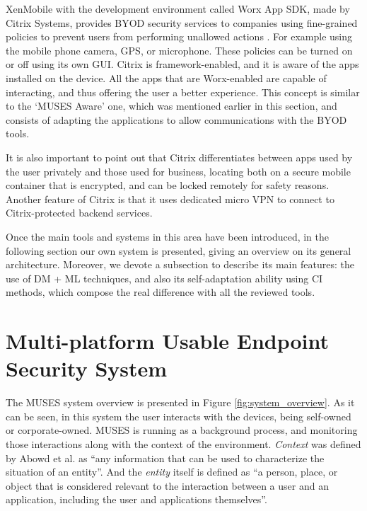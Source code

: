 XenMobile with the development environment called Worx App SDK, made by Citrix Systems, provides BYOD security services to companies using fine-grained policies to prevent users from performing unallowed actions \cite{WorxSDK}. For example using the mobile phone camera, GPS, or microphone. These policies can be turned on or off using its own GUI. Citrix is framework-enabled, and it is aware of the apps installed on the device. All the apps that are Worx-enabled are capable of interacting, and thus offering the user a better experience. This concept is similar to the `MUSES Aware' one, which was mentioned earlier in this section, and consists of adapting the applications to allow communications with the BYOD tools.

It is also important to point out that Citrix differentiates between apps used by the user privately and those used for business, locating both on a secure mobile container that is encrypted, and can be locked remotely for safety reasons. Another feature of Citrix is that it uses dedicated micro VPN to connect to Citrix-protected backend services.

Once the main tools and systems in this area have been introduced, in the following section our own system is presented, giving an overview on its general architecture. Moreover, we devote a subsection to describe its main features: the use of DM + ML techniques, and also its self-adaptation ability using CI methods, which compose the real difference with all the reviewed tools. 

\section{Multi-platform Usable Endpoint Security System}
\label{sec:muses}

The MUSES system overview is presented in Figure
\ref{fig:system_overview}. As it can be seen, in this system the user
interacts with the devices, being self-owned or corporate-owned. MUSES is running as a background process, and monitoring those interactions along with the context of the environment. \textit{Context} was defined by Abowd et
al. \cite{abowd1999towards} as ``any information that can be used to
characterize the situation of an entity''. And the \textit{entity} itself is defined as ``a person, place, or object that is considered relevant to the
interaction between a user and an application, including the user and applications
themselves''.

